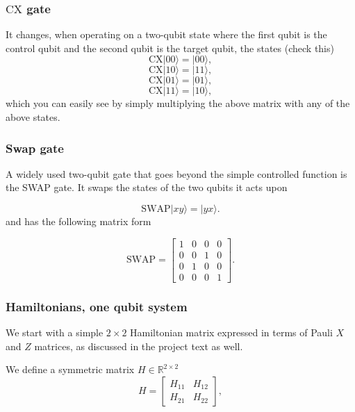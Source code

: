 \documentclass{beamer}
\begin{document}
\begin{frame}
\frametitle{$\mathrm{CX}$ gate}

It changes, when operating on a two-qubit state where the first qubit is the control qubit and the second qubit is the target qubit, the states (check this)
\[
\mathrm{CX}\vert 00\rangle=\vert 00\rangle,
\]
\[
\mathrm{CX}\vert 10\rangle= \vert 11\rangle,
\]
\[
\mathrm{CX}\vert 01\rangle= \vert 01\rangle,
\]
\[
\mathrm{CX}\vert 11\rangle= \vert 10\rangle,
\]
which you can easily see by simply multiplying the above matrix with any of the above states.
\end{frame}

\begin{frame}
\frametitle{Swap gate}

A widely used two-qubit gate that goes beyond the simple controlled function is the SWAP gate. It swaps the states of the two qubits it acts upon

\[
\mathrm{SWAP}\vert xy\rangle=\vert yx\rangle.
\]
and has the following matrix form

\[
\mathrm{SWAP}
=\begin{bmatrix}
1 & 0 & 0 & 0 \\
0 & 0 & 1 & 0 \\
0 & 1 & 0 & 0 \\
0 & 0 & 0 & 1
\end{bmatrix}.
\]
\end{frame}

\begin{frame}
\frametitle{Hamiltonians, one qubit system}

We start with a simple $2\times 2$ Hamiltonian matrix expressed in
terms of Pauli $X$ and $Z$ matrices, as discussed in the project text as well.

We define a  symmetric matrix  $H\in {\mathbb{R}}^{2\times 2}$
\[
H = \begin{bmatrix} H_{11} & H_{12} \\ H_{21} & H_{22}
\end{bmatrix},
\]
\end{frame}
\end{document}
